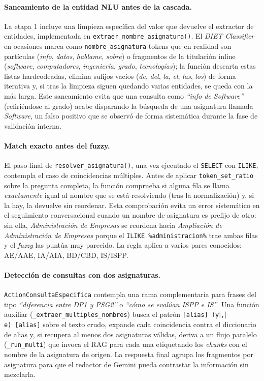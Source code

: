 \paragraph{Saneamiento de la entidad NLU antes de la cascada.} La etapa 1 incluye una limpieza específica del valor que devuelve el extractor de entidades, implementada en \texttt{extraer\_\allowbreak nombre\_\allowbreak asignatura()}. El \textit{DIET Classifier} en ocasiones marca como \texttt{nombre\_asignatura} tokens que en realidad son partículas (\textit{info}, \textit{datos}, \textit{hablame}, \textit{sobre}) o fragmentos de la titulación inline (\textit{software}, \textit{computadores}, \textit{ingeniería}, \textit{grado}, \textit{tecnologías}); la función descarta estas listas hardcodeadas, elimina sufijos vacíos (\textit{de}, \textit{del}, \textit{la}, \textit{el}, \textit{las}, \textit{los}) de forma iterativa y, si tras la limpieza siguen quedando varias entidades, se queda con la más larga. Este saneamiento evita que una consulta como \textit{``info de Software''} (refiriéndose al grado) acabe disparando la búsqueda de una asignatura llamada \textit{Software}, un falso positivo que se observó de forma sistemática durante la fase de validación interna.

\paragraph{Match exacto antes del fuzzy.} El paso final de \texttt{resolver\_asignatura()}, una vez ejecutado el \texttt{SELECT} con \texttt{ILIKE}, contempla el caso de coincidencias múltiples. Antes de aplicar \texttt{token\_set\_ratio} sobre la pregunta completa, la función comprueba si alguna fila se llama \textit{exactamente} igual al nombre que se está resolviendo (tras la normalización) y, si la hay, la devuelve sin reordenar. Esta comprobación evita un error sistemático en el seguimiento conversacional cuando un nombre de asignatura es prefijo de otro: sin ella, \textit{Administración de Empresas} se reordena hacia \textit{Ampliación de Administración de Empresas} porque el \texttt{ILIKE \%administracion\%} trae ambas filas y el \textit{fuzzy} las puntúa muy parecido. La regla aplica a varios pares conocidos: AE/AAE, IA/AIA, BD/CBD, IS/ISPP.

\paragraph{Detección de consultas con dos asignaturas.} \texttt{ActionConsultaEspecifica} contempla una rama complementaria para frases del tipo \textit{``diferencia entre DP1 y PSG2''} o \textit{``cómo se evalúan ISPP e IS''}. Una función auxiliar (\texttt{\_extraer\_multiples\_nombres}) busca el patrón \texttt{[alias]~(y$\vert$,$\vert$e)~[alias]} sobre el texto crudo, expande cada coincidencia contra el diccionario de alias y, si recupera al menos dos asignaturas válidas, deriva a un flujo paralelo (\texttt{\_run\_multi}) que invoca el RAG para cada una etiquetando los \textit{chunks} con el nombre de la asignatura de origen. La respuesta final agrupa los fragmentos por asignatura para que el redactor de Gemini pueda contrastar la información sin mezclarla.

